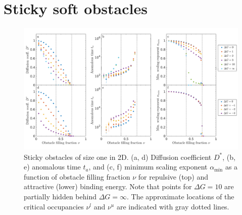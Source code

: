 \section{Sticky soft obstacles}
\begin{figure}[!hb]
  \begin{center}
	  \includegraphics[width=175mm]{figs/ch02_soft/soft_sticky_2d.png}
  \end{center}
	\caption[Sticky diffusion in 2D]
    {Sticky obstacles of size one in 2D.  (a, d) Diffusion
    coefficient $D^*$, (b, e) anomalous time $ t_a $, and (c, f)
    minimum scaling exponent $\alpha_{\min}$ as a function of
    obstacle filling fraction $\nu$ for repulsive (top) and attractive
    (lower) binding energy. Note that points for $\Delta G = 10 $ are
    partially hidden behind $ \Delta G = \infty$.  The approximate
    locations of the critical occupancies $ \nu^l $ and $ \nu^u $ are
    indicated with gray dotted lines.}\label{fig:sticky_2d}
\end{figure}

